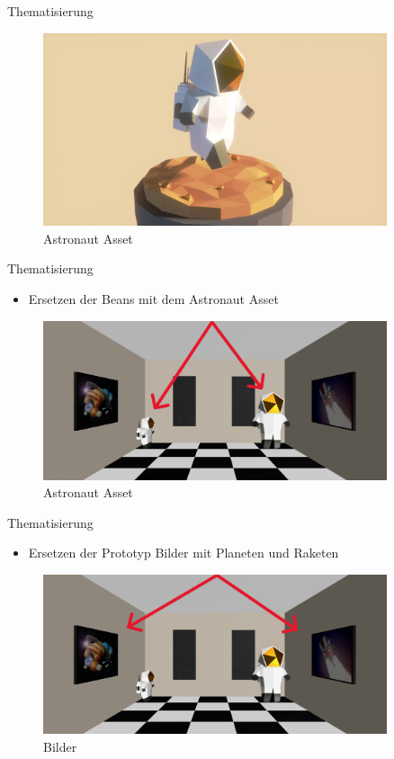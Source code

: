 \documentclass{beamer}
\begin{document}
\begin{frame}{Thematisierung}
\begin{figure}
    \centering
\includegraphics[width=0.9\textwidth, keepaspectratio]{astro}
\caption{Astronaut Asset \cite{astronaut}}
\end{figure}
\end{frame}


\begin{frame}{Thematisierung}
\begin{itemize}
\item Ersetzen der Beans mit dem Astronaut Asset
\end{itemize}
\begin{figure}
    \centering
\includegraphics[width=0.9\textwidth, keepaspectratio]{thema1}
\caption{Astronaut Asset \cite{astronaut}}
\end{figure}
\end{frame}


\begin{frame}{Thematisierung}
\begin{itemize}
\item Ersetzen der Prototyp Bilder mit Planeten und Raketen
\end{itemize}
\begin{figure}
    \centering
\includegraphics[width=0.9\textwidth, keepaspectratio]{thema2}
\caption{Bilder \cite{rakete} \cite{planet}}
\end{figure}
\end{frame}
\end{document}
